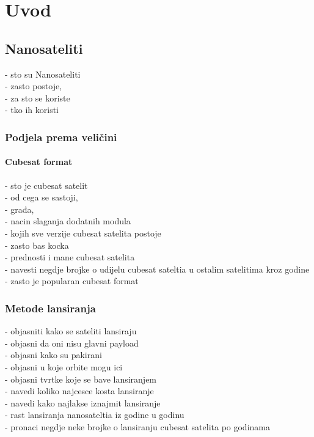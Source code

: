 \documentclass[times, utf8, diplomski, numeric]{templates/template}
\begin{document}
\chapter{Uvod}{
    \section{Nanosateliti}{
        - sto su Nanosateliti\\
        - zasto postoje, \\
            - za sto se koriste\\
            - tko ih koristi\\
        
        \subsection{Podjela prema veličini}{
            \subsubsection{Cubesat format}{
                - sto je cubesat satelit\\
                - od cega se sastoji, \\
                    - građa, \\
                    - nacin slaganja dodatnih modula\\
                - kojih sve verzije cubesat satelita postoje\\
                - zasto bas kocka\\
                - prednosti i mane cubesat satelita\\
                - navesti negdje brojke o udijelu cubesat sateltia u ostalim satelitima kroz godine\\
                - zasto je popularan cubesat format\\
            }
        }
        
        \subsection{Metode lansiranja}{
            - objasniti kako se sateliti lansiraju\\
                - objasni da oni nisu glavni payload\\
                - objasni kako su pakirani\\
                - objasni u koje orbite mogu ici\\
                - objasni tvrtke koje se bave lansiranjem\\
            - navedi koliko najcesce kosta lansiranje\\
            - navedi kako najlakse iznajmit lansiranje\\
            - rast lansiranja nanosateltia iz godine u godinu\\
                - pronaci negdje neke brojke o lansiranju cubesat satelita po godinama\\
        }
        
}}
\end{document}
